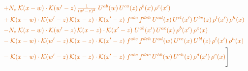 \documentclass[10pt]{article}
\numberwithin{equation}{section}
\begin{document}
\begin{align}
&\quad{\color{BFK}+N_c\;\mathcal{K}(x-w)\cdot\mathcal{K}(w'-z)\,\tfrac{1}{(x'-z)^{2}}\;U^{ab}(w)\,U^{ca}(z)\,\rho^{b}(x)\,\rho^{c}(x')}\notag\\
&\quad{\color{BFK}+\;\mathcal{K}(x-w)\cdot\mathcal{K}(w'-z)\,\mathcal{K}(x-z)\cdot\mathcal{K}(x'-z)\;f^{abc}\,f^{deh}\,U^{ad}(x)\,U^{cl}(x')\,U^{be}(z)\,\rho^{l}(x')\,\rho^{h}(x)}\notag\\
&\quad{\color{BFK}-N_c\;\mathcal{K}(x-w)\cdot\mathcal{K}(w'-z)\,\mathcal{K}(x-z)\cdot\mathcal{K}(x'-z)\;U^{ab}(x')\,U^{ac}(x)\,\rho^{b}(x')\,\rho^{c}(x)}\notag\\
&\quad{\color{BFK}-\;\mathcal{K}(x-w)\cdot\mathcal{K}(w'-z)\,\mathcal{K}(x-z)\cdot\mathcal{K}(x'-z)\;f^{abc}\,f^{deh}\,U^{ad}(w)\,U^{ce}(x)\,U^{bl}(z)\,\rho^{l}(x')\,\rho^{h}(x)}\notag\\
&\quad{\color{BFK}-\;\mathcal{K}(x-w)\cdot\mathcal{K}(w'-z)\,\mathcal{K}(x-z)\cdot\mathcal{K}(x'-z)\;f^{abc}\,f^{dae}\,U^{hb}(w)\,U^{eh}(z)\,\rho^{d}(x')\,\rho^{c}(x)}\Bigg]\label{eq:P6}
\end{align}
\end{document}
